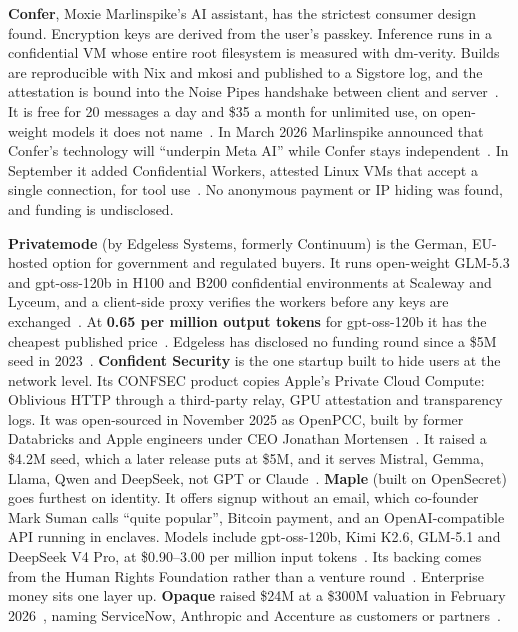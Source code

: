 \documentclass[10pt,a4paper]{article}
\begin{document}
\textbf{Confer}, Moxie Marlinspike's AI assistant, has the strictest consumer design found. Encryption keys are derived from the user's passkey. Inference runs in a confidential VM whose entire root filesystem is measured with dm-verity. Builds are reproducible with Nix and mkosi and published to a Sigstore log, and the attestation is bound into the Noise Pipes handshake between client and server~\cite{confer-blog-private-infere}. It is free for 20 messages a day and \$35 a month for unlimited use, on open-weight models it does not name~\cite{techcrunch-confer}. In March 2026 Marlinspike announced that Confer's technology will ``underpin Meta AI'' while Confer stays independent~\cite{confer-blog-meta-ai}. In September it added Confidential Workers, attested Linux VMs that accept a single connection, for tool use~\cite{confer-blog-confidential-w}. No anonymous payment or IP hiding was found, and funding is undisclosed.

\textbf{Privatemode} (by Edgeless Systems, formerly Continuum) is the German, EU-hosted option for government and regulated buyers. It runs open-weight GLM-5.3 and gpt-oss-120b in H100 and B200 confidential environments at Scaleway and Lyceum, and a client-side proxy verifies the workers before any keys are exchanged~\cite{privatemode-docs-architect}. At \textbf{\texteuro{}0.65 per million output tokens} for gpt-oss-120b it has the cheapest published price~\cite{privatemode-pricing}. Edgeless has disclosed no funding round since a \$5M seed in 2023~\cite{tech-eu-edgeless-systems}. \textbf{Confident Security} is the one startup built to hide users at the network level. Its CONFSEC product copies Apple's Private Cloud Compute: Oblivious HTTP through a third-party relay, GPU attestation and transparency logs. It was open-sourced in November 2025 as OpenPCC, built by former Databricks and Apple engineers under CEO Jonathan Mortensen~\cite{business-wire-openpcc-laun,finsmes-confident-security}. It raised a \$4.2M seed, which a later release puts at \$5M, and it serves Mistral, Gemma, Llama, Qwen and DeepSeek, not GPT or Claude~\cite{techcrunch-confident-secur,confident-security}. \textbf{Maple} (built on OpenSecret) goes furthest on identity. It offers signup without an email, which co-founder Mark Suman calls ``quite popular'', Bitcoin payment, and an OpenAI-compatible API running in enclaves. Models include gpt-oss-120b, Kimi K2.6, GLM-5.1 and DeepSeek V4 Pro, at \$0.90--3.00 per million input tokens~\cite{privacy-guides-forum-maple,maple-blog-maple-proxy}. Its backing comes from the Human Rights Foundation rather than a venture round~\cite{human-rights-foundation}. Enterprise money sits one layer up. \textbf{Opaque} raised \$24M at a \$300M valuation in February 2026~\cite{siliconangle-opaque}, naming ServiceNow, Anthropic and Accenture as customers or partners~\cite{pr-newswire-opaque-series}.
\end{document}

